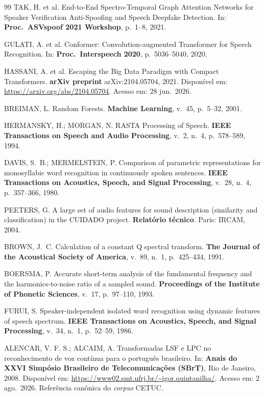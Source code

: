 \documentclass[12pt,a4paper]{article}
\begin{document}
\begin{thebibliography}{99}
	TAK, H. et al.
	End-to-End Spectro-Temporal Graph Attention Networks for Speaker Verification
	Anti-Spoofing and Speech Deepfake Detection.
	In: \textbf{Proc.\ ASVspoof 2021 Workshop}, p.~1--8, 2021.
	
	GULATI, A. et al.
	Conformer: Convolution-augmented Transformer for Speech Recognition.
	In: \textbf{Proc.\ Interspeech 2020}, p.~5036--5040, 2020.
	
	HASSANI, A. et al.
	Escaping the Big Data Paradigm with Compact Transformers.
	\textbf{arXiv preprint} arXiv:2104.05704, 2021.
	Disponível em: \url{https://arxiv.org/abs/2104.05704}.
	Acesso em: 28 jun.\ 2026.
	
	BREIMAN, L.
	Random Forests.
	\textbf{Machine Learning},
	v.~45, p.~5--32, 2001.
	
	HERMANSKY, H.; MORGAN, N.
	RASTA Processing of Speech.
	\textbf{IEEE Transactions on Speech and Audio Processing},
	v.~2, n.~4, p.~578--589, 1994.
	
	DAVIS, S.~B.; MERMELSTEIN, P.
	Comparison of parametric representations for monosyllabic word recognition in
	continuously spoken sentences.
	\textbf{IEEE Transactions on Acoustics, Speech, and Signal Processing},
	v.~28, n.~4, p.~357--366, 1980.
	
	PEETERS, G.
	A large set of audio features for sound description (similarity and
	classification) in the CUIDADO project.
	\textbf{Relatório técnico}. Paris: IRCAM, 2004.
	
	BROWN, J.~C.
	Calculation of a constant Q spectral transform.
	\textbf{The Journal of the Acoustical Society of America},
	v.~89, n.~1, p.~425--434, 1991.
	
	BOERSMA, P.
	Accurate short-term analysis of the fundamental frequency and the
	harmonics-to-noise ratio of a sampled sound.
	\textbf{Proceedings of the Institute of Phonetic Sciences},
	v.~17, p.~97--110, 1993.
	
	FURUI, S.
	Speaker-independent isolated word recognition using dynamic features of speech
	spectrum.
	\textbf{IEEE Transactions on Acoustics, Speech, and Signal Processing},
	v.~34, n.~1, p.~52--59, 1986.
	
	ALENCAR, V. F. S.; ALCAIM, A.
	Transformadas LSF e LPC no reconhecimento de voz contínua para o português
	brasileiro.
	In: \textbf{Anais do XXVI Simpósio Brasileiro de Telecomunicações (SBrT)},
	Rio de Janeiro, 2008.
	Disponível em: \url{https://www02.smt.ufrj.br/~igor.quintanilha/}.
	Acesso em: 2 ago.\ 2026.
	Referência canônica do \textit{corpus} CETUC.
	

\end{thebibliography}
\end{document}
